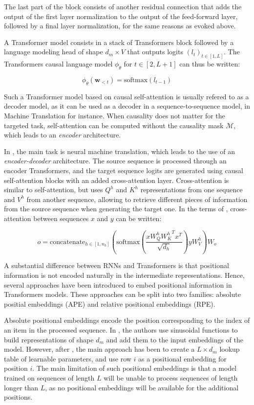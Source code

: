 The last part of the block consists of another residual connection that adds the output of the first layer normalization to the output of the feed-forward layer, followed by a final layer normalization, for the same reasons as evoked above.

A Transformer model consists in a stack of Transformers block followed by a language modeling head of shape $d_m \times V$ that outputs logits $(l_t)_{t \in [1, L]}$. The Transformers causal language model $\phi_\theta$ for $t \in [2, L+1]$ can thus be written:

$$
\phi_\theta(\mathbf{w}_{<t}) = \text{softmax} (l_{t-1})
$$

Such a Transformer model based on causal self-attention is usually refered to as a decoder model, as it can be used as a decoder in a sequence-to-sequence model, in Machine Translation for instance. When causality does not matter for the targeted task, self-attention can be computed without the causality mask $\mathcal{M}$, which leads to an \textit{encoder} architecture.

In \citet{vaswani2017attention}, the main task is neural machine translation, which leads to the use of an \textit{encoder-decoder} architecture. The source sequence is processed through an encoder Transformers, and the target sequence logits are generated using causal self-attention blocks with an added cross-attention layer. Cross-attention is similar to self-attention, but uses $Q^h$ and $K^h$ representations from one sequence and $V^h$ from another sequence, allowing to retrieve different pieces of information from the source sequence when generating the target one. In the terms of , cross-attention between sequences $x$ and $y$ can be written:

\begin{equation}
    \label{eq:causal_attn}
o = \text{concatenate}_{h\in [1, n_h]} \left( \text{softmax} \left(\frac{x W_Q^h {W_K^h}^T x^T}{\sqrt{d_h}}\right) y W_V^h \right) W_o
\end{equation}

A substantial difference between RNNs and Transformers is that positional information is not encoded naturally in the intermediate representations. Hence, several approaches have been introduced to embed positional information in Transformers models. These approaches can be split into two families: absolute positial embeddings (APE) and relative positional embeddings (RPE).

Absolute positional embeddings encode the position corresponding to the index of an item in the processed sequence. In \citet{vaswani2017attention}, the authors use sinusoidal functions to build representations of shape $d_m$ and add them to the input embeddings of the model. However, after \citet{devlin-etal-2019-bert}, the main approach has been to create a $L \times d_m$ lookup table of learnable parameters, and use row $i$ as a positional embedding for position $i$. The main limitation of such positional embeddings is that a model trained on sequences of length $L$ will be unable to process sequences of length longer than $L$, as no positional embeddings will be available for the additional positions.

